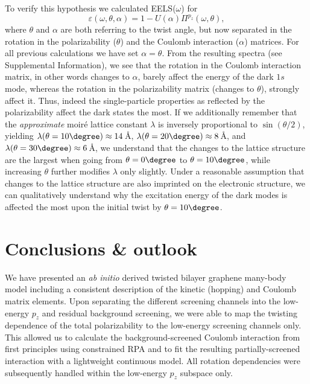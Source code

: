 To verify this hypothesis we calculated EELS($\omega$) for
\vspace{-0.1cm}\begin{equation*}
    \varepsilon(\omega, \theta, \alpha) = 1 - U(\alpha) \Pi^{p_z}(\omega, \theta),
\end{equation*}
\vspace{-0.1cm}where $\theta$ and $\alpha$ are both referring to the twist angle, but now separated in the rotation in the polarizability ($\theta$) and the Coulomb interaction ($\alpha$) matrices. For all previous calculations we have set $\alpha = \theta$.
From the resulting spectra (see Supplemental Information), %
we see that the rotation in the Coulomb interaction matrix, in other words changes to $\alpha$, barely affect the energy of the dark $1s$ mode, whereas the rotation in the polarizability matrix (changes to $\theta$), strongly affect it.
Thus, indeed the single-particle properties as reflected by the polarizability affect the dark states the most. If we additionally remember that the \emph{approximate} moir\'{e} lattice constant $\lambda$ is inversely proportional to $\sin(\theta/2)$, yielding $\lambda(\theta=10\degree) \approx 14\,$\AA, $\lambda(\theta=20\degree) \approx 8\,$\AA, and $\lambda(\theta=30\degree) \approx 6\,$\AA, we understand that the changes to the lattice structure are the largest when going from $\theta=0\degree$ to $\theta=10\degree$, while increasing $\theta$ further modifies $\lambda$ only slightly. Under a reasonable assumption that changes to the lattice structure are also imprinted on the electronic structure, we can qualitatively understand why the excitation energy of the dark modes is affected the most upon the initial twist by $\theta=10\degree$.

\section{Conclusions \& outlook}
    
We have presented an \textit{ab initio} derived twisted bilayer graphene many-body model including a consistent description of the kinetic (hopping) and Coulomb matrix elements. Upon separating the different screening channels into the low-energy $p_z$ and residual background screening, we were able to map the twisting dependence of the total polarizability to the low-energy screening channels only. This allowed us to calculate the background-screened Coulomb interaction from first principles using constrained RPA and to fit the resulting partially-screened interaction with a lightweight continuous model. All rotation dependencies were subsequently handled within the low-energy $p_z$ subspace only. 

